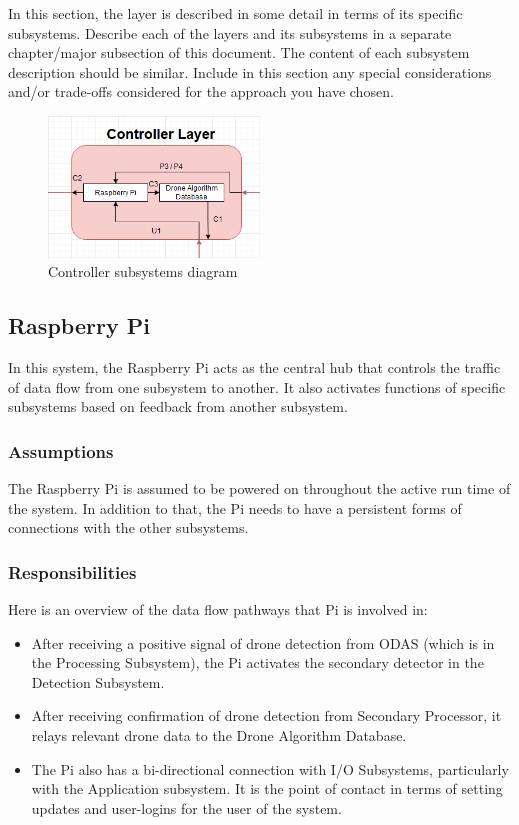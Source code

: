 In this section, the layer is described in some detail in terms of its specific subsystems. Describe each of the layers and its subsystems in a separate chapter/major subsection of this document. The content of each subsystem description should be similar. Include in this section any special considerations and/or trade-offs considered for the approach you have chosen.

\begin{figure}[h!]
	\centering
 	\includegraphics[width=0.50\textwidth]{images/controller}
 \caption{Controller subsystems diagram}
\end{figure}

\subsection{Raspberry Pi}
In this system, the Raspberry Pi acts as the central hub that controls the traffic of data flow from one subsystem to another. It also activates functions of specific subsystems based on feedback from another subsystem.

\subsubsection{Assumptions}
The Raspberry Pi is assumed to be powered on throughout the active run time of the system. In addition to that, the Pi needs to have a persistent forms of connections with the other subsystems.

\subsubsection{Responsibilities}
Here is an overview of the data flow pathways that Pi is involved in:
\begin{itemize}
  \item After receiving a positive signal of drone detection from ODAS (which is in the Processing Subsystem), the Pi activates the secondary detector in the Detection Subsystem. 
  \item After receiving confirmation of drone detection from Secondary Processor, it relays relevant drone data to the Drone Algorithm Database.
  \item The Pi also has a bi-directional connection with I/O Subsystems, particularly with the Application subsystem. It is the point of contact in terms of setting updates and user-logins for the user of the system.
\end{itemize}

